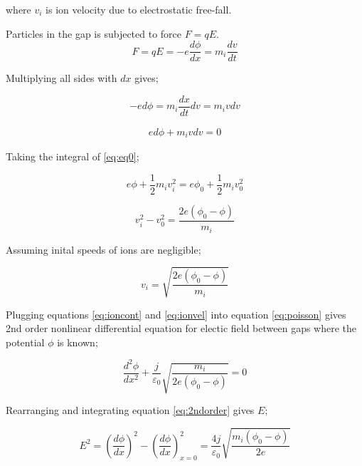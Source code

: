 where $v_i$ is ion velocity due to electrostatic free-fall.

Particles in the gap is subjected to force $F=qE$.
\begin{equation}
   F =  qE = -e \frac{d \phi}{dx} = m_i \frac{dv}{dt}
    \label{eq:gapforce}
\end{equation}

Multiplying all sides with $dx$ gives;

\begin{equation}
    -ed\phi = m_i\frac{dx}{dt}dv = m_i v dv
    \label{eq:dv}
\end{equation}

\begin{eqnarray}
    ed\phi + m_i v dv = 0
    \label{eq:eq0}
\end{eqnarray}

Taking the integral of \ref{eq:eq0};

\begin{equation}
    e\phi + \frac{1}{2}m_i v^2_i = e\phi_0 + \frac{1}{2}m_i v^2_0
    \label{eq:integrated}
\end{equation}

\begin{equation}
    v^2_i - v^2_0 = \frac{2e(\phi_0 - \phi)}{m_i}
\end{equation}

Assuming inital speeds of ions are negligible;

\begin{equation}
    v_i = \sqrt{\frac{2e(\phi_0 - \phi)}{m_i}}
    \label{eq:ionvel}
\end{equation}


Plugging equations \ref{eq:ioncont} and \ref{eq:ionvel} into equation \ref{eq:poisson} gives 2nd order nonlinear differential equation for electic field between gaps where the potential $\phi$ is known;

\begin{equation}
    \frac{d^2 \phi}{d x^2} + \frac{j}{\varepsilon_0}\sqrt{\frac{m_i}{2e (\phi_0-\phi)}} = 0
    \label{eq:2ndorder}
\end{equation}

Rearranging and integrating equation \ref{eq:2ndorder} gives $E$;

\begin{equation}
    E^2 = \left(\frac{d\phi}{dx}\right)^2 - \left(\frac{d\phi}{dx}\right)^2_{x=0}  = \frac{4j}{\varepsilon_0}\sqrt{\frac{m_i (\phi_0 -\phi)}{2e}}
    \label{eq:integratedE}
\end{equation}

